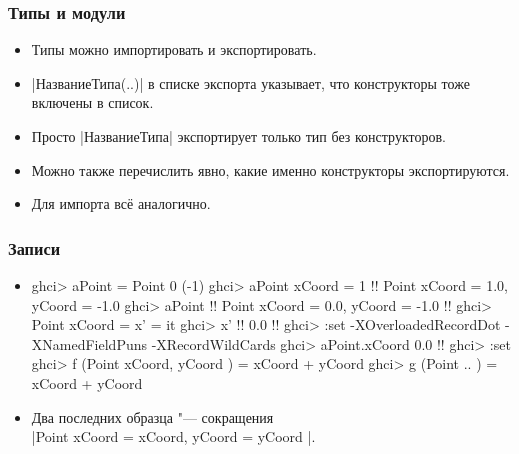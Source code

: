 \documentclass[10pt]{beamer}
\begin{document}
\begin{frame}[fragile]
  \frametitle{Типы и модули}
  \begin{itemize}
    \item Типы можно импортировать и экспортировать.
    \item \haskinline|НазваниеТипа(..)| в списке экспорта указывает, что конструкторы тоже включены в список.
    \item Просто \haskinline|НазваниеТипа| экспортирует только тип без конструкторов.
    \item Можно также перечислить явно, какие именно конструкторы экспортируются.
    \item Для импорта всё аналогично.
  \end{itemize}
\end{frame}

\begin{frame}[fragile]
  \frametitle{Записи}\hypertarget{rec2}{}
  \hyperlink{rec1}{}
  \begin{itemize}
    \item
          \begin{haskellsmall}
            ghci> aPoint = Point 0 (-1)
            ghci> aPoint { xCoord = 1 } !\pause!
            Point {xCoord = 1.0, yCoord = -1.0}
            ghci> aPoint !\pause!
            Point {xCoord = 0.0, yCoord = -1.0} !\pause!
            ghci> Point {xCoord = x'} = it
            ghci> x' !\pause!
            0.0 !\pause!
            ghci> :set -XOverloadedRecordDot -XNamedFieldPuns -XRecordWildCards
            ghci> aPoint.xCoord
            0.0 !\pause!
            ghci> :set 
            ghci> f (Point { xCoord, yCoord }) = xCoord + yCoord
            ghci> g (Point { .. }) = xCoord + yCoord
          \end{haskellsmall}
    \item Два последних образца "--- сокращения\\ \haskinline|Point { xCoord = xCoord, yCoord = yCoord }|.
  \end{itemize}
\end{frame}
\end{document}
